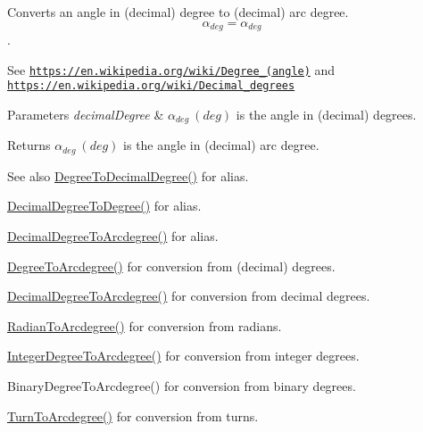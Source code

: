 Converts an angle in (decimal) degree to (decimal) arc degree. \[\alpha_{deg}=\alpha_{deg}\]. 

See \href{https://en.wikipedia.org/wiki/Degree_(angle)}{\tt https\+://en.\+wikipedia.\+org/wiki/\+Degree\+\_\+(angle)} and \href{https://en.wikipedia.org/wiki/Decimal_degrees}{\tt https\+://en.\+wikipedia.\+org/wiki/\+Decimal\+\_\+degrees} 
\begin{DoxyParams}{Parameters}
{\em decimal\+Degree} & $\alpha_{deg}\ (deg)$ is the angle in (decimal) degrees. \\
\hline
\end{DoxyParams}
\begin{DoxyReturn}{Returns}
$\alpha_{deg}\ (deg)$ is the angle in (decimal) arc degree. 
\end{DoxyReturn}
\begin{DoxySeeAlso}{See also}
\mbox{\hyperlink{group___e_g_x_math-_conversions-_angle_conversions-_degree_ga568afc1d436d425bf5d4edea584aee08}{Degree\+To\+Decimal\+Degree()}} for alias. 

\mbox{\hyperlink{group___e_g_x_math-_conversions-_angle_conversions-_decimal_degree_ga0aa7f2f5dbb00cf4ab303421c6e33ccf}{Decimal\+Degree\+To\+Degree()}} for alias. 

\mbox{\hyperlink{group___e_g_x_math-_conversions-_angle_conversions-_decimal_degree_gacdd463fcabffeb598ebda65b012ce743}{Decimal\+Degree\+To\+Arcdegree()}} for alias. 

\mbox{\hyperlink{group___e_g_x_math-_conversions-_angle_conversions-_degree_gac1b5f3b68f66c77a6df4ceef842c9b19}{Degree\+To\+Arcdegree()}} for conversion from (decimal) degrees. 

\mbox{\hyperlink{group___e_g_x_math-_conversions-_angle_conversions-_decimal_degree_gacdd463fcabffeb598ebda65b012ce743}{Decimal\+Degree\+To\+Arcdegree()}} for conversion from decimal degrees. 

\mbox{\hyperlink{group___e_g_x_math-_conversions-_angle_conversions-_radian_ga3dfdc97357cc07f8379976bbc08f9852}{Radian\+To\+Arcdegree()}} for conversion from radians. 

\mbox{\hyperlink{group___e_g_x_math-_conversions-_angle_conversions-_integer_degree_gaf633d0b82bfb7586ce86ffbcf78d8f7a}{Integer\+Degree\+To\+Arcdegree()}} for conversion from integer degrees. 

Binary\+Degree\+To\+Arcdegree() for conversion from binary degrees. 

\mbox{\hyperlink{group___e_g_x_math-_conversions-_angle_conversions-_turn_ga7bdc3a81ce316dd47b1a3179489fa195}{Turn\+To\+Arcdegree()}} for conversion from turns. 


\end{DoxySeeAlso}
